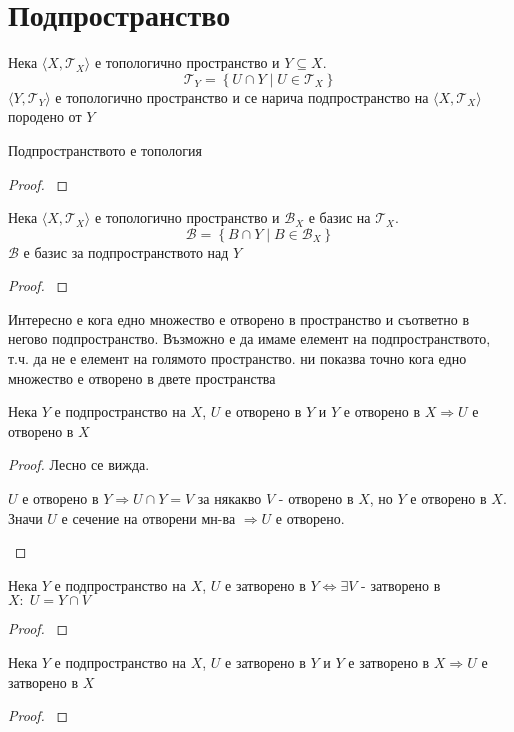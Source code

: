 \section{Подпространство}
\begin{definition}
    Нека $\langle X, \mathcal T_X \rangle$ е топологично пространство и $Y \subseteq X$.
    \begin{equation*}
        \mathcal T_Y = \left\{ U \cap Y \mid U \in \mathcal T_X \right\}
    \end{equation*}
    $\langle Y, \mathcal T_Y\rangle$ е топологично пространство и се нарича подпространство на $\langle X, \mathcal T_X \rangle$ породено от $Y$
\end{definition}
\begin{lemma}
    Подпространството е топология
\end{lemma}
\begin{proof}
    \cite[p.~89]{munkrestopology}
\end{proof}
\begin{lemma}
    Нека $\langle X, \mathcal T_X \rangle$ е топологично пространство и $\mathcal B_X$ е базис на $\mathcal T_X$.
    \begin{equation*}
        \mathcal B = \left\{ B \cap Y \mid B \in \mathcal B_X \right\}
    \end{equation*}
    $\mathcal B$ е базис за подпространството над $Y$
\end{lemma}
\begin{proof}
    \cite[p.~89]{munkrestopology}
\end{proof}
Интересно е кога едно множество е отворено в пространство и съответно в негово подпространство. Възможно е да имаме елемент на подпространството, т.ч. да не е елемент на голямото пространство.  ни показва точно кога едно множество е отворено в двете пространства
\begin{lemma}\label{lem:open-in-subspace}
    Нека $Y$ е подпространство на $X$, $U$ е отворено в $Y$ и $Y$ е отворено в $X \Rightarrow U$ е отворено в $X$
\end{lemma}
\begin{proof}
    Лесно се вижда.

    $U$ е отворено в $Y \Rightarrow U \cap Y = V$ за някакво $V$ - отворено в $X$, но $Y$ е отворено в $X$. Значи $U$ е сечение на отворени мн-ва $\Rightarrow U$ е отворено.

    \cite[p.~89]{munkrestopology}
\end{proof}
\begin{lemma}
    Нека $Y$ е подпространство на $X$, $U$ е затворено в $Y \iff \exists V $ - затворено в $X:\; U = Y \cap V$
\end{lemma}
\begin{proof}
    \cite[p.~94]{munkrestopology}
\end{proof}
\begin{lemma}
    Нека $Y$ е подпространство на $X$, $U$ е затворено в $Y$ и $Y$ е затворено в $X \Rightarrow U$ е затворено в $X$
\end{lemma}
\begin{proof}
    \cite[p.~95]{munkrestopology}
\end{proof}

